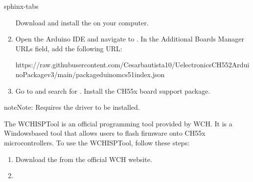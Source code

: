 \documentclass[letterpaper,10pt,english]{sphinxmanual}
\begin{document}
\begin{sphinxuseclass}{sphinx-tabs}
\begin{enumerate}
\sphinxAtStartPar
Download and install the  on your computer.

\item {} 
\sphinxAtStartPar
{}

\sphinxAtStartPar
Open the Arduino IDE and navigate to . In the Additional Boards Manager URLs field, add the following URL:

\begin{sphinxVerbatim}[commandchars=\\\{\}]
https://raw.githubusercontent.com/Cesarbautista10/Uelectronics\PYGZhy{}CH552\PYGZhy{}Arduino\PYGZhy{}Package\PYGZhy{}v3/main/package\PYGZus{}duino\PYGZus{}mcs51\PYGZus{}index.json
\end{sphinxVerbatim}

\item {} 
\sphinxAtStartPar
{}

\sphinxAtStartPar
Go to  and search for . Install the CH55x board support package.

\end{enumerate}

\begin{sphinxadmonition}{note}{Note:}
\sphinxAtStartPar
Requires the  driver to be installed.
\end{sphinxadmonition}

\sphinxAtStartPar
{}

\sphinxAtStartPar
The WCHISPTool is an official programming tool provided by WCH. It is a Windows\sphinxhyphen{}based tool that allows users to flash firmware onto CH55x microcontrollers.
To use the WCHISPTool, follow these steps:
\begin{enumerate}
%
\item {} 
\sphinxAtStartPar
{}

\sphinxAtStartPar
Download the  from the official WCH website.

\item {} 
\sphinxAtStartPar
{}


\end{enumerate}
\end{sphinxuseclass}
\end{document}
